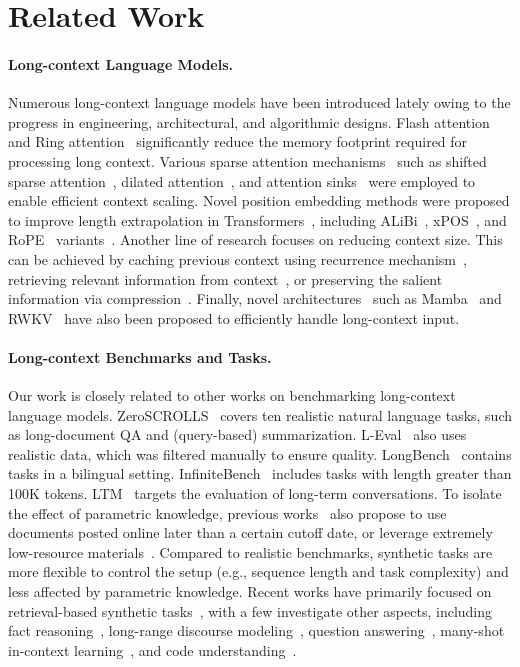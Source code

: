 \section{Related Work} 

\paragraph{Long-context Language Models.} Numerous long-context language models have been introduced lately owing to the progress in engineering, architectural, and algorithmic designs. Flash attention~\citep{fa,fa2} and Ring attention~\citep{ra} significantly reduce the memory footprint required for processing long context. Various sparse attention mechanisms~\citep{sparse_attn,sparse_is_enough} such as shifted sparse attention~\citep{longlora}, dilated attention~\citep{longnet}, and attention sinks~\citep{lminfinite, streemllm} were employed to enable efficient context scaling. Novel position embedding methods were proposed to improve length extrapolation in Transformers~\citep{transformer}, including ALiBi~\citep{alibi}, xPOS~\citep{xpos}, and RoPE~\citep{rope} variants~\citep{pi,abf,yarn,e2llm,longrope,pose}. Another line of research focuses on reducing context size. This can be achieved by caching previous context using recurrence mechanism~\citep{beacon,rmt,infiniteformer,memformer}, retrieving relevant information from context~\citep{meet, landmark, longmem, focus, infllm}, or preserving the salient information via compression~\citep{longllmlingua}. Finally, novel architectures~\citep{s4,h3,hyena,longconv,retnet,xlstm,yoco} such as Mamba~\citep{mamba} and RWKV~\citep{rwkv} have also been proposed to efficiently handle long-context input. 


\paragraph{Long-context Benchmarks and Tasks.} Our work is closely related to other works on benchmarking long-context language models. ZeroSCROLLS~\citep{zeroscrolls} covers ten realistic natural language tasks, such as long-document QA and (query-based) summarization. L-Eval~\citep{leval} also uses realistic data, which was filtered manually to ensure quality. LongBench~\citep{longbench} contains tasks in a bilingual setting. InfiniteBench~\citep{inftybench} includes tasks with length greater than 100K tokens. LTM~\citep{ltm} targets the evaluation of long-term conversations.  To isolate the effect of parametric knowledge, previous works~\citep{bamboo,loogle} also propose to use documents posted online later than a certain cutoff date, or leverage extremely low-resource materials~\citep{mtob}. 
Compared to realistic benchmarks, synthetic tasks are more flexible to control the setup (e.g., sequence length and task complexity) and less affected by parametric knowledge. 
Recent works have primarily focused on retrieval-based synthetic tasks~\citep{needle, landmark, longchat, lostmiddle,loft}, with a few investigate other aspects, including fact reasoning~\citep{babilong, nocha}, long-range discourse modeling~\citep{chapterbreak}, question answering~\citep{flenQA, lveval}, many-shot in-context learning~\citep{manyiclgdm, manyiclcmu, lifelongicl}, and code understanding~\citep{repoQA}.
